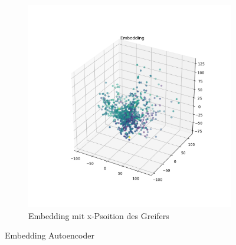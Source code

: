 \begin{figure}[h]
\begin{subfigure}[c]{0.49\textwidth}
			\includegraphics[width=1\textwidth, center]{bilder/Hauptteil/Autoencoder_Grappel_Detection/Embedding_x.png}
			\caption{Embedding mit x-Psoition des Greifers}
			\label{img:RecalllIoUt_RegressionAufAutoencoder}	
		\end{subfigure}
		\caption{Embedding Autoencoder}
		\label{img:EmbeddingAE}
	\end{figure}
	
